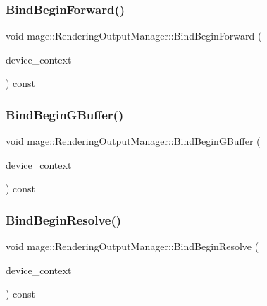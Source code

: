 \subsubsection{\texorpdfstring{Bind\+Begin\+Forward()}{BindBeginForward()}}
{\footnotesize\ttfamily void mage\+::\+Rendering\+Output\+Manager\+::\+Bind\+Begin\+Forward (\begin{DoxyParamCaption}\item[{I\+D3\+D11\+Device\+Context2 $\ast$}]{device\+\_\+context }\end{DoxyParamCaption}) const\hspace{0.3cm}{\ttfamily [noexcept]}}

\hypertarget{classmage_1_1_rendering_output_manager_ac70991c338dde28a1e37f37259c309f6}{}\label{classmage_1_1_rendering_output_manager_ac70991c338dde28a1e37f37259c309f6} 
\subsubsection{\texorpdfstring{Bind\+Begin\+G\+Buffer()}{BindBeginGBuffer()}}
{\footnotesize\ttfamily void mage\+::\+Rendering\+Output\+Manager\+::\+Bind\+Begin\+G\+Buffer (\begin{DoxyParamCaption}\item[{I\+D3\+D11\+Device\+Context2 $\ast$}]{device\+\_\+context }\end{DoxyParamCaption}) const\hspace{0.3cm}{\ttfamily [noexcept]}}

\hypertarget{classmage_1_1_rendering_output_manager_afd4cc1caabf0e0aaff006a8068da46c1}{}\label{classmage_1_1_rendering_output_manager_afd4cc1caabf0e0aaff006a8068da46c1} 
\subsubsection{\texorpdfstring{Bind\+Begin\+Resolve()}{BindBeginResolve()}}
{\footnotesize\ttfamily void mage\+::\+Rendering\+Output\+Manager\+::\+Bind\+Begin\+Resolve (\begin{DoxyParamCaption}\item[{I\+D3\+D11\+Device\+Context2 $\ast$}]{device\+\_\+context }\end{DoxyParamCaption}) const\hspace{0.3cm}{\ttfamily [noexcept]}}

